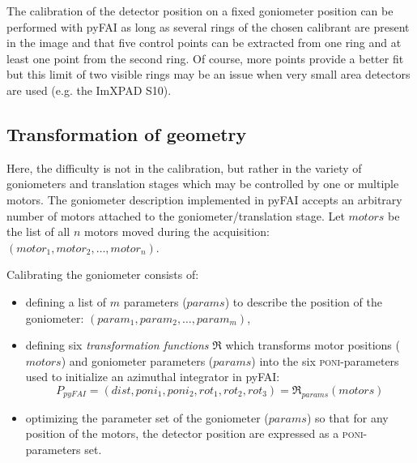 \documentclass[preprint]{iucr}              %
\begin{document}
The calibration of the detector position on a fixed goniometer position can be
performed with pyFAI as long as several rings of the chosen calibrant are
present in the image and that five control points can be extracted from one
ring and at least one point from the second ring. 
Of course, more points provide a better fit but this limit of two visible rings 
may be an issue when very small area detectors are used (e.g. the ImXPAD S10).

\subsection{Transformation of geometry}

Here, the difficulty is not in the calibration, but rather in the
variety of goniometers and translation stages which may be controlled by one or 
multiple motors.
The goniometer description implemented in pyFAI accepts an
arbitrary number of motors attached to the goniometer/translation stage. 
Let $motors$ be the list of all $n$ motors moved during the acquisition: 
$(motor_1, motor_2, \ldots, motor_n)$. 

Calibrating the goniometer consists of:
\begin{itemize}
  \item defining a list of $m$ parameters ($params$) to describe the position of the goniometer:
  $(param_1, param_2, \ldots, param_m)$,
  \item defining six \textit{transformation functions} $\Re$ which transforms motor positions ($motors$)
  and goniometer parameters ($params$) into the six \textsc{poni}-parameters used to
  initialize an azimuthal integrator in pyFAI:
\begin{equation}
P_{pyFAI} = (dist, poni_1, poni_2, rot_1, rot_2, rot_3) = \Re_{params}(motors)
\end{equation}
  \item optimizing the parameter set of the goniometer ($params$) so that
  for any position of the motors, the detector position are expressed as
  a \textsc{poni}-parameters set.
\end{itemize}

\end{document}
